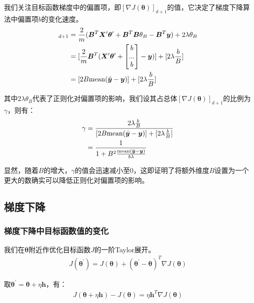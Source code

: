 \documentclass[12pt, a4paper]{article}
\newcommand{\imat}{\bm}
\newcommand{\ivec}{\bm}
\newcommand{\mean}{{\rm mean}}
\newcommand{\Xm}{\imat{X}}
\newcommand{\thetav}{\ivec{\theta}}
\newcommand{\yv}{\ivec{y}}
\newcommand{\hv}{\ivec{h}}
\begin{document}
        我们关注目标函数梯度中的偏置项，即$[\nabla J(\thetav)]_{d + 1}$的值，它决定了梯度下降算法中偏置项$b$的变化速度。
        \begin{align*}
        [\nabla J(\thetav)]_{d + 1}
        &= \frac{2}{m} (\ivec{B}^T \Xm^{\prime} \thetav^\prime + \ivec{B}^T \ivec{B} \theta_{B} - \ivec{B}^T \yv) + 2 \lambda \theta_{B} \\
        &= [\frac{2}{m} \ivec{B}^T (\Xm^{\prime} \thetav^\prime + \begin{bmatrix} b \\ ... \\ b \end{bmatrix} - \yv)] + [2 \lambda \frac{b}{B}] \\
        &= [2 B \mean(\hat{\yv} - \yv)] + [2 \lambda \frac{b}{B}]
        \end{align*}

        其中$2 \lambda \theta_{B}$代表了正则化对偏置项的影响，我们设其占总体$[\nabla J(\thetav)]_{d + 1}$的比例为$\gamma$，则有：
        \begin{align*}
        \gamma
        &= \frac{2 \lambda \frac{b}{B}}{[2 B \mean(\hat{\yv} - \yv)] + [2 \lambda \frac{b}{B}]} \\
        &= \frac{1}{1 + B^2 \frac{\mean(\hat{\yv} - \yv)}{b \lambda}}
        \end{align*}

        显然，随着$B$的增大，$\gamma$的值会迅速减小至0，这即证明了将额外维度$B$设置为一个更大的数确实可以降低正则化对偏置项的影响。

    \subsection{梯度下降}

    \subsubsection{梯度下降中目标函数值的变化}

        我们在$\thetav$附近作优化目标函数$J$的一阶Taylor展开。
        \begin{align*}
        J(\thetav^{\prime}) = J(\thetav) + (\thetav^{\prime} - \thetav)^T \nabla J(\thetav)
        \end{align*}

        取$\thetav^{\prime} = \thetav + \eta \hv$，有：
        \begin{equation}\begin{aligned}
        J(\thetav + \eta \hv) - J(\thetav) = \eta \hv^T \nabla J(\thetav)
        \end{aligned}\end{equation}
\end{document}
